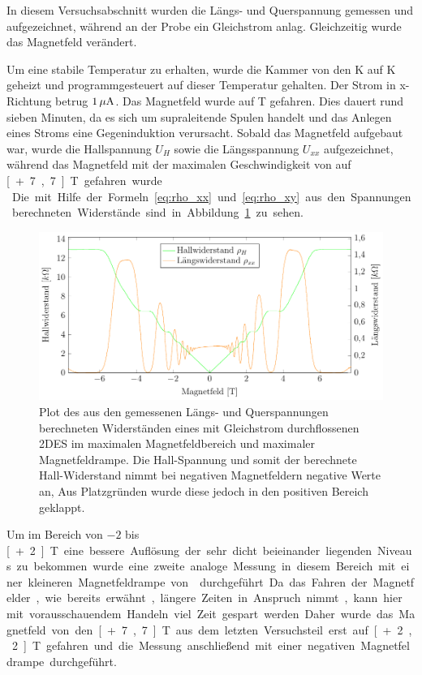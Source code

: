 
In diesem Versuchsabschnitt wurden die Längs- und Querspannung gemessen und aufgezeichnet, während an der Probe ein Gleichstrom anlag. Gleichzeitig wurde das Magnetfeld verändert.

Um eine stabile Temperatur zu erhalten, wurde die Kammer von den \unit[1,5]{K} auf \unit[2]{K} geheizt und programmgesteuert auf dieser Temperatur gehalten. Der Strom in x-Richtung betrug $\unit[1]{\mu A}$. Das Magnetfeld wurde auf \unit[-7,7]{T} gefahren. Dies dauert rund sieben Minuten, da es sich um supraleitende Spulen handelt und das Anlegen eines Stroms eine Gegeninduktion verursacht. Sobald das Magnetfeld aufgebaut war, wurde die Hallspannung $U_H$ sowie die Längsspannung $U_{xx}$ aufgezeichnet, während das Magnetfeld mit der maximalen Geschwindigkeit von  auf \unit[+7,7]{T} gefahren wurde.\\

Die mit Hilfe der Formeln~\eqref{eq:rho_xx} und \eqref{eq:rho_xy} aus den Spannungen berechneten Widerstände sind in Abbildung~\ref{fig:full_range_dc} zu sehen.

\begin{figure}[h]
	\centering
	\includegraphics[scale=1]{graphs/dc/full_range.pdf}
	\caption[Gleichstrommessung im maximalen Magnetfeldbereich]{
		Plot des aus den gemessenen Längs- und Querspannungen berechneten Widerständen eines mit Gleichstrom durchflossenen 2DES im maximalen Magnetfeldbereich und maximaler Magnetfeldrampe. Die Hall-Spannung und somit der berechnete Hall-Widerstand nimmt bei negativen Magnetfeldern negative Werte an, Aus Platzgründen wurde diese jedoch in den positiven Bereich geklappt.
	}
	\label{fig:full_range_dc}
\end{figure}

Um im Bereich von $-2$ bis \unit[+2]{T} eine bessere Auflösung der sehr dicht beieinander liegenden Niveaus zu bekommen wurde eine zweite analoge Messung in diesem Bereich mit einer kleineren Magnetfeldrampe von  durchgeführt. Da das Fahren der Magnetfelder, wie bereits erwähnt, längere Zeiten in Anspruch nimmt, kann hier mit vorausschauendem Handeln viel Zeit gespart werden. Daher wurde das Magnetfeld von den \unit[+7,7]{T} aus dem letzten Versuchsteil erst auf \unit[+2,2]{T} gefahren und die Messung anschließend mit einer negativen Magnetfeldrampe durchgeführt.

